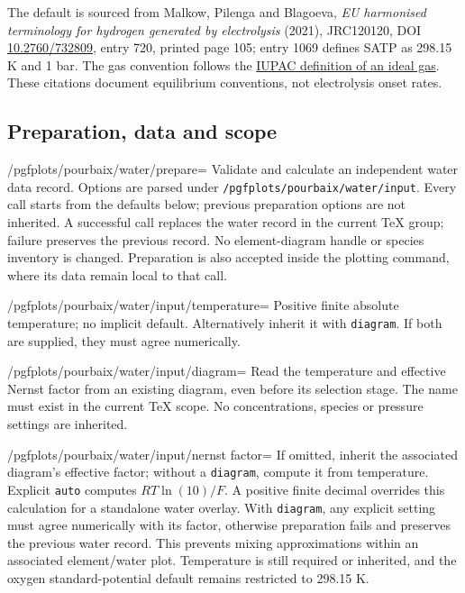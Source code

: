 \documentclass[a4paper,11pt]{ltxdoc}
\begin{document}
The default is sourced from Malkow, Pilenga and Blagoeva,
\emph{EU harmonised terminology for hydrogen generated by electrolysis}
(2021), JRC120120, DOI \href{https://doi.org/10.2760/732809}{10.2760/732809},
entry 720, printed page 105; entry 1069 defines SATP as 298.15 K and 1 bar.
The gas convention follows the
\href{https://goldbook.iupac.org/terms/view/I02935}{IUPAC definition of an ideal gas}.
These citations document equilibrium conventions, not electrolysis onset rates.

\subsection{Preparation, data and scope}
\begin{key}{/pgfplots/pourbaix/water/prepare=}
Validate and calculate an independent water data record. Options are parsed under
\texttt{/pgfplots/pourbaix/water/input}. Every call starts from the defaults below;
previous preparation options are not inherited. A successful call replaces the
water record in the current TeX group; failure preserves the previous record.
No element-diagram handle or species inventory is changed. Preparation is also
accepted inside the plotting command, where its data remain local to that call.
\end{key}
\begin{key}{/pgfplots/pourbaix/water/input/temperature=}
Positive finite absolute temperature; no implicit default. Alternatively inherit
it with \texttt{diagram}. If both are supplied, they must agree numerically.
\end{key}
\begin{key}{/pgfplots/pourbaix/water/input/diagram=}
Read the temperature and effective Nernst factor from an existing diagram,
even before its selection stage. The name must exist in the current TeX scope.
No concentrations, species or pressure settings are inherited.
\end{key}
\begin{key}{/pgfplots/pourbaix/water/input/nernst factor=}
If omitted, inherit the associated diagram's effective factor; without a
\texttt{diagram}, compute it from temperature. Explicit \texttt{auto} computes
$RT\ln(10)/F$. A positive finite decimal overrides this calculation for a
standalone water overlay. With \texttt{diagram}, any explicit setting must agree
numerically with its factor, otherwise preparation fails and preserves the
previous water record. This prevents mixing approximations within an associated
element/water plot. Temperature is still required or inherited, and the oxygen
standard-potential default remains restricted to 298.15 K.
\end{key}
\end{document}
